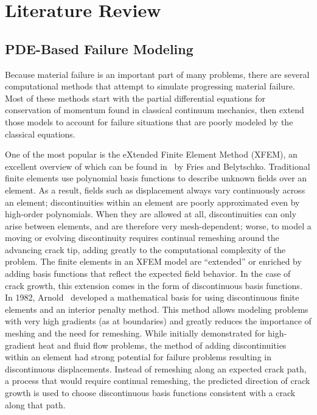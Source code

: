 \chapter{Literature Review}
\section{PDE-Based Failure Modeling}
Because material failure is an important part of many problems, there are several computational methods that attempt to simulate progressing material failure. 
Most of these methods start with the partial differential equations for conservation of momentum found in classical continuum mechanics, then extend those models to account for failure situations that are poorly modeled by the classical equations.

One of the most popular is the eXtended Finite Element Method (XFEM), an excellent overview of which can be found in~\cite{fries2010extended} by Fries and Belytschko.
Traditional finite elements use polynomial basis functions to describe unknown fields over an element.
As a result, fields such as displacement always vary continuously across an element; discontinuities within an element are poorly approximated even by high-order polynomials.
When they are allowed at all, discontinuities can only arise between elements, and are therefore very mesh-dependent; worse, to model a moving or evolving discontinuity requires continual remeshing around the advancing crack tip, adding greatly to the computational complexity of the problem.
The finite elements in an XFEM model are ``extended'' or enriched by adding basis functions that reflect the expected field behavior. 
In the case of crack growth, this extension comes in the form of discontinuous basis functions.
In 1982, Arnold~\cite{arnold1982interior} developed a mathematical basis for using discontinuous finite elements and an interior penalty method.
This method allows modeling problems with very high gradients (as at boundaries) and greatly reduces the importance of meshing and the need for remeshing.
While initially demonstrated for high-gradient heat and fluid flow problems, the method of adding discontinuities within an element had strong potential for failure problems resulting in discontinuous displacements.
Instead of remeshing along an expected crack path, a process that would require continual remeshing, the predicted direction of crack growth is used to choose discontinuous basis functions consistent with a crack along that path.

